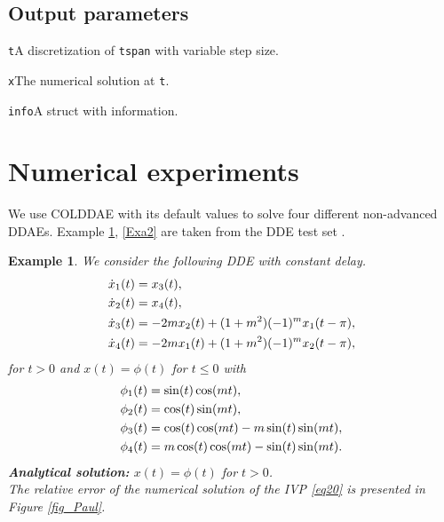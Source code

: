 \documentclass[final,reqno]{siamltex}
\renewenvironment{itemize}[1]{\begin{compactitem}#1}{\end{compactitem}}
\newtheorem{example}[theorem]{Example}
\begin{document}
\subsection{Output parameters}
\begin{itemize}
\item {\tt t}\quad A discretization of {\tt tspan} with variable step size.
\item {\tt x}\quad The numerical solution at {\tt t}.
\item {\tt info}\quad A struct with information.
\end{itemize}

\section{Numerical experiments}
We use COLDDAE with its default values to solve four different non-advanced DDAEs. 
Example \ref{Exa1}, \ref{Exa2} are taken from the DDE test set \cite{Pau94}.
%
\begin{example}\label{Exa1} We consider the following DDE with constant delay.
%
\bsq\label{eq20}
\begin{equation}\label{eq20a}
\bsp{
\dot{x}_1(t) & = x_3(t),\\
\dot{x}_2(t) & = x_4(t),\\
\dot{x}_3(t) & = -2mx_2(t)+(1+m^2)(-1)^mx_1(t-\pi),\\
\dot{x}_4(t) & = -2mx_1(t)+(1+m^2)(-1)^mx_2(t-\pi),
}
\end{equation}
for $t>0$ and $x(t)=\phi(t)$ for $t\leq 0$ with 
\begin{equation}\label{eq20b}
\bsp{
{\phi}_1(t) & = \sin(t)\cos(mt),\\
{\phi}_2(t) & = \cos(t)\sin(mt),\\
{\phi}_3(t) & = \cos(t)\cos(mt)-m\sin(t)\sin(mt),\\
{\phi}_4(t) & =m\cos(t)\cos(mt)-\sin(t)\sin(mt).
}
\end{equation}
\esq
%
{\bf Analytical solution:} \quad $x(t)=\phi(t)$ for $t>0$.\\
The relative error of the numerical solution of the IVP \eqref{eq20} is presented in Figure \ref{fig_Paul}.
\end{example}
%
\end{document}
